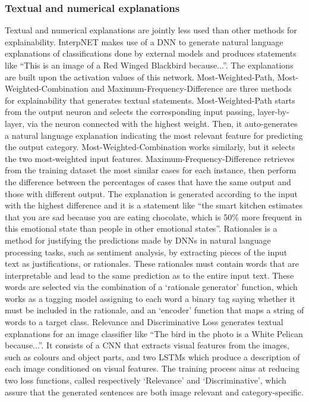\documentclass[final,1p,times]{elsarticle}
\begin{document}
\subsubsection{Textual and numerical explanations}
Textual and numerical explanations are jointly less used than other methods for explainability. 
InterpNET \cite{barratt2017interpnet} makes use of a DNN to generate natural language explanations of classifications done by external models and produces statements like ``This is an image of a Red Winged Blackbird because...''. The explanations are built upon the activation values of this network.
Most-Weighted-Path, Most-Weighted-Combination and Maximum-Frequency-Difference \cite{garcia2019human} are three methods for explainability that generates textual statements.
Most-Weighted-Path starts from the output neuron and selects the corresponding input passing, layer-by-layer, via the neuron connected with the highest weight. Then, it auto-generates a natural language explanation indicating the most relevant feature for predicting the output category. Most-Weighted-Combination works similarly, but it selects the two most-weighted input features. Maximum-Frequency-Difference retrieves from the training dataset the most similar cases for each instance, then perform the difference between the percentages of cases that have the same output and those with different output. The explanation is generated according to the input with the highest difference and it is a statement like ``the smart kitchen estimates that you are sad because you are eating chocolate, which is 50\% more frequent in this emotional state than people in other emotional states''.
Rationales \cite{lei2016rationalizing} is a method for justifying the predictions made by DNNs in natural language processing tasks, such as sentiment analysis, by extracting pieces of the input text as justifications, or rationales. These rationales must contain words that are interpretable and lead to the same prediction as to the entire input text. These words are selected via the combination of a `rationale generator' function, which works as a tagging model assigning to each word a binary tag saying whether it must be included in the rationale, and an `encoder' function that maps a string of words to a target class.
Relevance and Discriminative Loss \cite{hendricks2016generating,hendricks2018grounding} generates textual explanations for an image classifier like ``The bird in the photo is a White Pelican because...''. It consists of a CNN that extracts visual features from the images, such as colours and object parts, and two LSTMs which produce a description of each image conditioned on visual features. The training process aims at reducing two loss functions, called respectively `Relevance' and `Discriminative', which assure that the generated sentences are both image relevant and category-specific. \\
\end{document}

